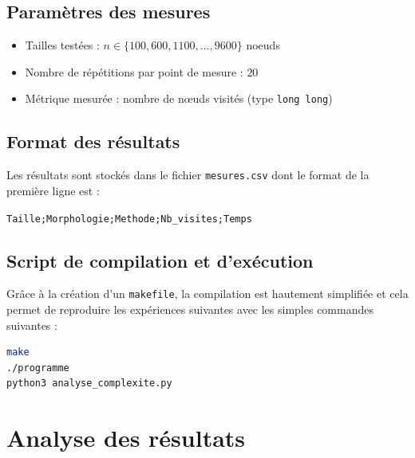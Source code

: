 \documentclass[12pt, a4paper]{article}
\begin{document}
\subsection{Paramètres des mesures}


\begin{itemize}
    \item Tailles testées : $n \in \{100, 600, 1100, \ldots, 9600\}$ noeuds
    \item Nombre de répétitions par point de mesure : $20$
    \item Métrique mesurée : nombre de nœuds visités (type \texttt{long long})
\end{itemize}

\subsection{Format des résultats}

Les résultats sont stockés dans le fichier \texttt{mesures.csv} dont le format de la première ligne est :

\begin{center}
    \texttt{Taille;Morphologie;Methode;Nb\_visites;Temps}
\end{center}

\subsection{Script de compilation et d'exécution}

Grâce à la création d'un \texttt{makefile}, la compilation est hautement simplifiée et cela permet de reproduire les expériences suivantes avec les simples commandes suivantes :

\begin{lstlisting}[language=bash, style=styleC, caption={Compilation et exécution}]
make 
./programme
python3 analyse_complexite.py
\end{lstlisting}

\section{Analyse des résultats}
\end{document}
